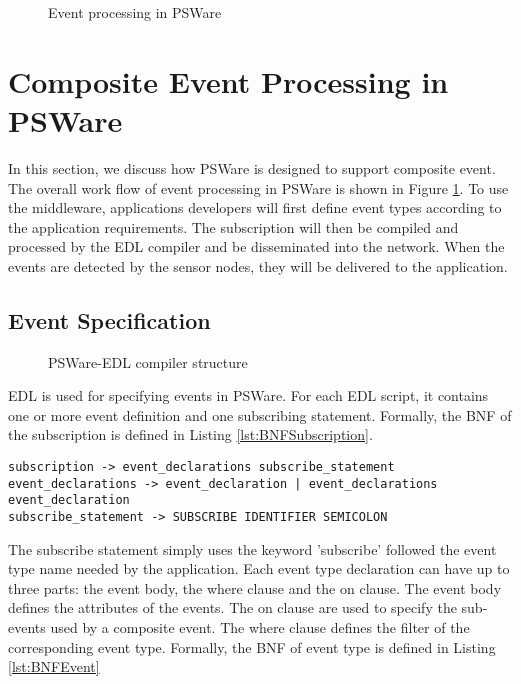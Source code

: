 \begin{figure}
\centering
{}
\caption{Event processing in PSWare}
\label{fig:psware-architecture}
\end{figure}

\section{Composite Event Processing in PSWare}
\label{sec:design}
In this section, we discuss how PSWare is designed to support composite event. The overall work flow of event processing in PSWare is shown in Figure \ref{fig:psware-architecture}. To use the middleware, applications developers will first define event types according to the application requirements. The subscription will then be compiled and processed by the EDL compiler and be disseminated into the network. When the events are detected by the sensor nodes, they will be delivered to the application.

\subsection{Event Specification}
\begin{figure}
\centering
{}
\caption{PSWare-EDL compiler structure}
\label{fig:edlcompiler}
\end{figure}

EDL is used for specifying events in PSWare. For each EDL script, it contains one or more event definition and one subscribing statement. Formally, the BNF of the subscription is defined in Listing \ref{lst:BNFSubscription}.

\begin{lstlisting}[caption=BNF (simplified) of subscription, label=lst:BNFSubscription]
subscription -> event_declarations subscribe_statement
event_declarations -> event_declaration | event_declarations event_declaration
subscribe_statement -> SUBSCRIBE IDENTIFIER SEMICOLON
\end{lstlisting}

The subscribe statement simply uses the keyword 'subscribe' followed the event type name needed by the application. Each event type declaration can have up to three parts: the event body, the where clause and the on clause. The event body defines the attributes of the events. The on clause are used to specify the sub-events used by a composite event. The where clause defines the filter of the corresponding event type. Formally, the BNF of event type is defined in Listing \ref{lst:BNFEvent}

